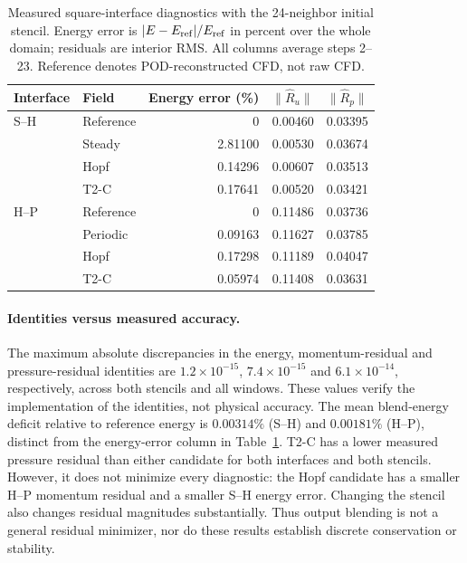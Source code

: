 \begin{table}[H]
\centering\small
\caption{Measured square-interface diagnostics with the 24-neighbor initial
stencil. Energy error is $|E-E_{\rm ref}|/E_{\rm ref}$ in percent over the
whole domain; residuals are interior RMS. All columns average steps 2--23.
Reference denotes POD-reconstructed CFD, not raw CFD.}
\label{tab:fusion_residual_measured}
\begin{tabular}{@{}llrrr@{}}
\toprule
Interface & Field & Energy error (\%) & $\|\widehat R_u\|$ & $\|\widehat R_p\|$\\
\midrule
S--H & Reference & 0 & 0.00460 & 0.03395\\
& Steady & 2.81100 & 0.00530 & 0.03674\\
& Hopf & 0.14296 & 0.00607 & 0.03513\\
& T2-C & 0.17641 & 0.00520 & 0.03421\\
\midrule
H--P & Reference & 0 & 0.11486 & 0.03736\\
& Periodic & 0.09163 & 0.11627 & 0.03785\\
& Hopf & 0.17298 & 0.11189 & 0.04047\\
& T2-C & 0.05974 & 0.11408 & 0.03631\\
\bottomrule
\end{tabular}
\end{table}

\paragraph{Identities versus measured accuracy.}
The maximum absolute discrepancies in the energy, momentum-residual and
pressure-residual identities are $1.2\times10^{-15}$,
$7.4\times10^{-15}$ and $6.1\times10^{-14}$, respectively, across both
stencils and all windows. These values verify the implementation of the
identities, not physical accuracy. The mean blend-energy deficit relative
to reference energy is $0.00314\%$ (S--H) and $0.00181\%$ (H--P), distinct
from the energy-error column in Table~\ref{tab:fusion_residual_measured}.
T2-C has a lower measured pressure residual than either candidate for both
interfaces and both stencils. However, it does not minimize every diagnostic:
the Hopf candidate has a smaller H--P momentum residual and a smaller S--H
energy error. Changing the stencil also changes residual magnitudes
substantially. Thus output blending is not a general residual minimizer,
nor do these results establish discrete conservation or stability.

